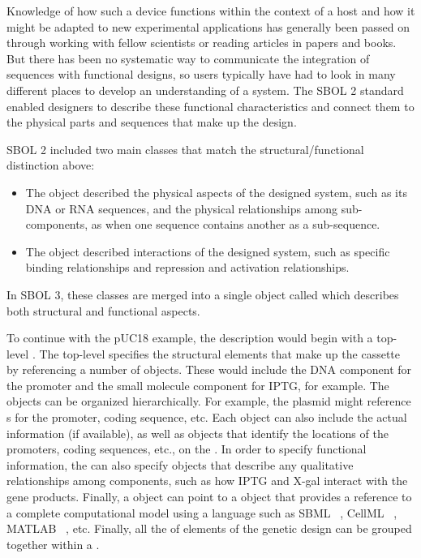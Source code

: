 Knowledge of how such a device functions within the context of a host and how it might be adapted to new experimental applications has generally been passed on through working with fellow scientists or reading articles in papers and books. 
But there has been no systematic way to communicate the integration of sequences with functional designs, so users typically have had to look in many different places to develop an understanding of a system.  
The SBOL 2 standard enabled designers to describe these functional characteristics and connect them to the physical parts and sequences that make up the design. 

SBOL 2 included two main classes that match the structural/functional distinction above:

\begin{itemize}
\item The  object described the physical aspects of the designed system, such as its DNA or RNA sequences, and the physical relationships among sub-components, as when one sequence contains another as a sub-sequence.
\item The  object described interactions of the designed system, such as specific binding relationships and repression and activation relationships. 
\end{itemize}

In SBOL 3, these classes are merged into a single object called  which describes both structural and functional aspects.


To continue with the pUC18 example, the description would begin with a top-level .  
The top-level  specifies the structural elements that make up the cassette by referencing a number of  objects. These would include the DNA component for the promoter and the small molecule component for IPTG, for example.  
The  objects can be organized hierarchically.  
For example, the plasmid  might reference s for the promoter, coding sequence, etc.  
Each  object can also include the actual  information (if available), as well as  objects that identify the locations of the promoters, coding sequences, etc., on the .  
In order to specify functional information, the  can also specify  objects that describe any qualitative relationships among components, such as how IPTG and X-gal interact with the gene products.  Finally, a  object can point to a  object that provides a reference to a complete computational model using a language such as SBML  ~\cite{SBML}, CellML ~\cite{CellML}, MATLAB ~\cite{matlab}, etc.  Finally, all the of elements of the genetic design can be grouped together within a .

